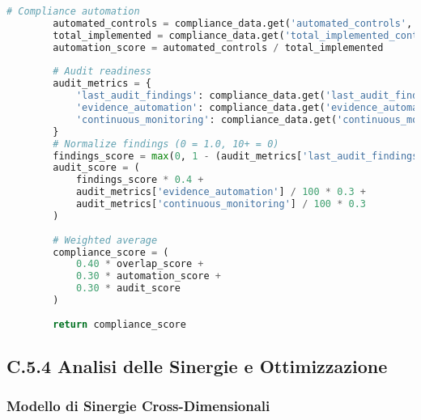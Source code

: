 \begin{lstlisting}[language=Python, caption=Calcolo Score Componenti GIST]
        # Compliance automation
        automated_controls = compliance_data.get('automated_controls', 0)
        total_implemented = compliance_data.get('total_implemented_controls', 1)
        automation_score = automated_controls / total_implemented
        
        # Audit readiness
        audit_metrics = {
            'last_audit_findings': compliance_data.get('last_audit_findings', 10),
            'evidence_automation': compliance_data.get('evidence_automation_rate', 0),
            'continuous_monitoring': compliance_data.get('continuous_monitoring_coverage', 0)
        }
        # Normalize findings (0 = 1.0, 10+ = 0)
        findings_score = max(0, 1 - (audit_metrics['last_audit_findings'] / 10))
        audit_score = (
            findings_score * 0.4 +
            audit_metrics['evidence_automation'] / 100 * 0.3 +
            audit_metrics['continuous_monitoring'] / 100 * 0.3
        )
        
        # Weighted average
        compliance_score = (
            0.40 * overlap_score +
            0.30 * automation_score +
            0.30 * audit_score
        )
        
        return compliance_score
\end{lstlisting}

\subsection{C.5.4 Analisi delle Sinergie e Ottimizzazione}

\subsubsection{Modello di Sinergie Cross-Dimensionali}

